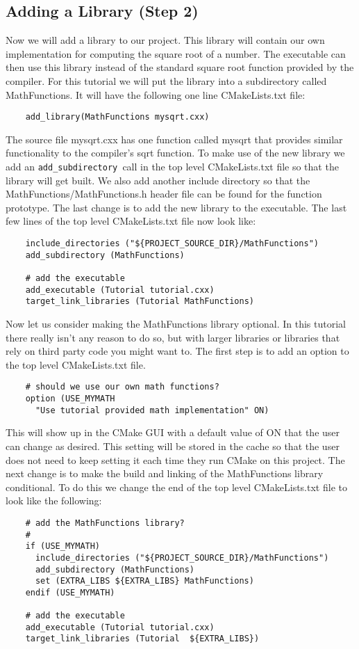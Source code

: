 \documentclass[UTF8,a4paper,8pt]{ctexart}
\begin{document}
\subsection{Adding a Library (Step 2)}
	Now we will add a library to our project. This library will contain our own implementation for computing the square root of a number. The executable can then use this library instead of the standard square root function provided by the compiler. For this tutorial we will put the library into a subdirectory called MathFunctions. It will have the following one line CMakeLists.txt file:
	\begin{lstlisting}
	add_library(MathFunctions mysqrt.cxx)
	\end{lstlisting}
	
	The source file mysqrt.cxx has one function called mysqrt that provides similar functionality to the compiler’s sqrt function. To make use of the new library we add an \verb|add_subdirectory |call in the top level CMakeLists.txt file so that the library will get built. We also add another include directory so that the MathFunctions/MathFunctions.h header file can be found for the function prototype. The last change is to add the new library to the executable. The last few lines of the top level CMakeLists.txt file now look like:
	\begin{lstlisting}
	include_directories ("${PROJECT_SOURCE_DIR}/MathFunctions")
	add_subdirectory (MathFunctions) 
 
	# add the executable
	add_executable (Tutorial tutorial.cxx)
	target_link_libraries (Tutorial MathFunctions)
	\end{lstlisting}
	
	Now let us consider making the MathFunctions library optional. In this tutorial there really isn’t any reason to do so, but with larger libraries or libraries that rely on third party code you might want to. The first step is to add an option to the top level CMakeLists.txt file.
	\begin{lstlisting}
	# should we use our own math functions?
	option (USE_MYMATH 
      "Use tutorial provided math implementation" ON) 
	\end{lstlisting}
	
	This will show up in the CMake GUI with a default value of ON that the user can change as desired. This setting will be stored in the cache so that the user does not need to keep setting it each time they run CMake on this project. The next change is to make the build and linking of the MathFunctions library conditional. To do this we change the end of the top level CMakeLists.txt file to look like the following:
	\begin{lstlisting}
	# add the MathFunctions library?
	#
	if (USE_MYMATH)
	  include_directories ("${PROJECT_SOURCE_DIR}/MathFunctions")
	  add_subdirectory (MathFunctions)
	  set (EXTRA_LIBS ${EXTRA_LIBS} MathFunctions)
	endif (USE_MYMATH)
	 
	# add the executable
	add_executable (Tutorial tutorial.cxx)
	target_link_libraries (Tutorial  ${EXTRA_LIBS})	
	\end{lstlisting}
\end{document}
